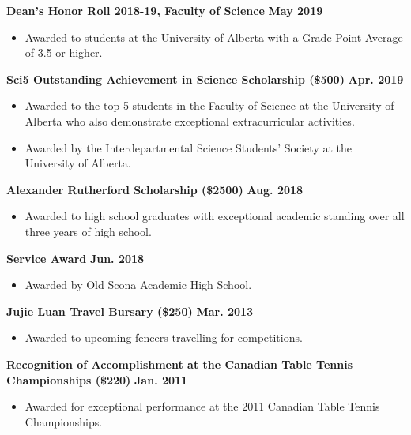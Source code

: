 \documentclass{article}
\begin{document}
    \textbf{Dean's Honor Roll 2018-19, Faculty of Science} \hfill \textbf{May 2019}
        \begin{itemize}
            \item Awarded to students at the University of Alberta with a Grade Point Average of 3.5 or higher.
        \end{itemize}
    \textbf{Sci5 Outstanding Achievement in Science Scholarship (\$500)} \hfill \textbf{Apr. 2019}
        \begin{itemize}
            \item Awarded to the top 5 students in the Faculty of Science at the University of Alberta who also demonstrate exceptional extracurricular activities.
            \item Awarded by the Interdepartmental Science Students' Society at the University of Alberta.
        \end{itemize}
    \textbf{Alexander Rutherford Scholarship (\$2500)} \hfill \textbf{Aug. 2018}
        \begin{itemize}
            \item Awarded to high school graduates with exceptional academic standing over all three years of high school.
        \end{itemize}
    \textbf{Service Award} \hfill \textbf{Jun. 2018}
        \begin{itemize}
            \item Awarded by Old Scona Academic High School.
        \end{itemize}
    \textbf{Jujie Luan Travel Bursary (\$250)} \hfill \textbf{Mar. 2013}
        \begin{itemize}
            \item Awarded to upcoming fencers travelling for competitions.
        \end{itemize}
    \textbf{Recognition of Accomplishment at the Canadian Table Tennis Championships (\$220)} \hfill \textbf{Jan. 2011}
        \begin{itemize}
            \item Awarded for exceptional performance at the 2011 Canadian Table Tennis Championships.
        \end{itemize}
\end{document}
